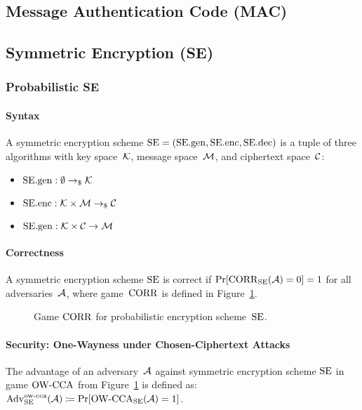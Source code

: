 \documentclass[a4paper,orivec]{llncs}
\begin{document}
\subsection{Message Authentication Code (MAC)}


\subsection{Symmetric Encryption (SE)}

\subsubsection{Probabilistic SE}
\paragraph{Syntax}
A symmetric encryption scheme $\mathrm{SE}=(\mathrm{SE}.\mathrm{gen},\mathrm{SE}.\mathrm{enc},\mathrm{SE}.\mathrm{dec})$ is a tuple of three algorithms with key space~$\mathcal{K}$, message space~$\mathcal{M}$, and ciphertext space~$\mathcal{C}$:

\begin{itemize}
    \item $\mathrm{SE}.\mathrm{gen}: \emptyset \to_\$ \mathcal{K}$
    \item $\mathrm{SE}.\mathrm{enc}: \mathcal{K}\times\mathcal{M} \to_\$ \mathcal{C}$
    \item $\mathrm{SE}.\mathrm{gen}: \mathcal{K}\times\mathcal{C} \to \mathcal{M}$
\end{itemize}

\paragraph{Correctness}
A symmetric encryption scheme $\mathrm{SE}$ is correct if $\Pr[\mathrm{CORR}_{\mathrm{SE}}(\mathcal{A})=0]=1$ for all adversaries~$\mathcal{A}$, where game~$\mathrm{CORR}$ is defined in Figure~\ref{fig:sym:enc:corr:prob}.

\begin{figure}[!ht]
    \centering
    \nicoresetlinenr%
    \fbox{%
        \scalebox{\codescalefactor}{%
        }%
    }
    \caption{%
        Game $\mathrm{CORR}$ for probabilistic encryption scheme~$\mathrm{SE}$.
    }
    \label{fig:sym:enc:corr:prob}
\end{figure}

\paragraph{Security: One-Wayness under Chosen-Ciphertext Attacks}
The advantage of an adversary~$\mathcal{A}$ against symmetric encryption scheme $\mathrm{SE}$ in game ${\mathrm{OW}\text{-}\mathrm{CCA}}$ from Figure~\ref{fig:sym:enc:corr:prob} is defined as:\\
$\mathrm{Adv}_{\mathrm{SE}}^{\mathrm{ow}\text{-}\mathrm{cca}}(\mathcal{A})\coloneqq\Pr[{\mathrm{OW}\text{-}\mathrm{CCA}}_{\mathrm{SE}}(\mathcal{A})=1]$.
\end{document}
